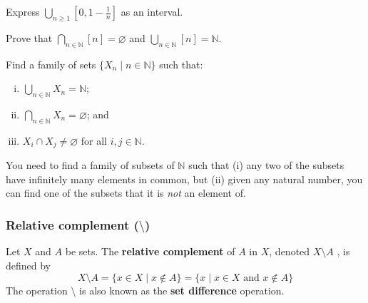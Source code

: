 

\begin{exercise}
Express $\displaystyle\bigcup_{n \ge 1} [0,1-\frac{1}{n}]$ as an interval.
\end{exercise}

\begin{exercise}
Prove that $\displaystyle\bigcap_{n \in \mathbb{N}} [n] = \varnothing$ and $\displaystyle\bigcup_{n \in \mathbb{N}} [n] = \mathbb{N}$.
\end{exercise}

\begin{exercise}
\label{exSubsetsFiniteIntersectionInhabitedInfiniteIntersectionEmpty}
Find a family of sets $\{ X_n \mid n \in \mathbb{N} \}$ such that:
\begin{enumerate}[(i)]
\item $\displaystyle\bigcup_{n \in \mathbb{N}} X_n = \mathbb{N}$;
\item $\displaystyle\bigcap_{n \in \mathbb{N}} X_n = \varnothing$; and
\item $X_i \cap X_j \ne \varnothing$ for all $i,j \in \mathbb{N}$.
\end{enumerate}
\begin{backhint}
You need to find a family of subsets of $\mathbb{N}$ such that (i) any two of the subsets have infinitely many elements in common, but (ii) given any natural number, you can find one of the subsets that it is \textit{not} an element of.
\end{backhint}
\end{exercise}


\subsubsection*{Relative complement ($\setminus$)}

\begin{definition}
\label{defRelativeComplement}
Let $X$ and $A$ be sets. The \textbf{relative complement} of $A$ in $X$, denoted $X \setminus A$ , is defined by
\[ X \setminus A = \{ x \in X \mid x \not \in A \} = \{ x \mid x \in X \text{ and } x \not\in A \} \]
The operation $\setminus$ is also known as the \textbf{set difference} operation.
\end{definition}

